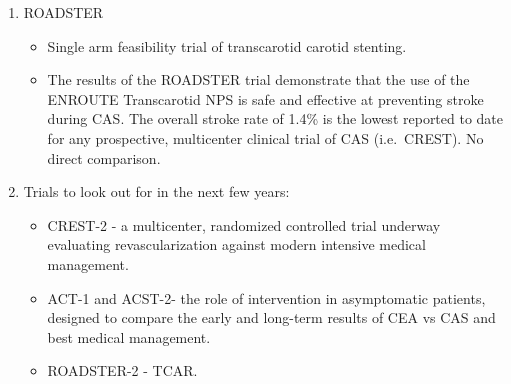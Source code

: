 \documentclass[
]{book}
\providecommand{\tightlist}{%
  \setlength{\itemsep}{0pt}\setlength{\parskip}{0pt}}
\begin{document}
\begin{enumerate}
  \begin{itemize}
  \item
    Compared CEA vs.~CAS in both symptomatic and asymptomatic
    patients.
  \item
    Composite endpoint of 30-day stroke, MI, death equivalent
    between CEA and CAS.
  \item
    CAS had a significantly higher incidence of stroke and death
    than CEA and CEA higher incidence of MI.

    \begin{itemize}
    \tightlist
    \item
      Follow up at 10 years demonstrated no difference in
      composite stroke/MI/death but increased rate of stroke/death
      in stented patients likely attributable to increased
      periprocedural stroke. \citep{brottLongTermResultsStenting2016b}
    \item
      CAS patients with stroke had a higher impact on QOL than CEA
      patients with MI.\citep{brott2010, redfern2011, mantese2010}
    \end{itemize}
  \item
    Subanalyses identified that older patients (\textgreater70y) had better
    outcomes after CEA than CAS, the QOL impact of stroke was more
    significant than that of MI, and anatomic characteristics of
    carotid lesions (longer, sequential, remote) were predictive of
    increased stroke and death after CAS.
  \item
    Unfortunately, this study provides a benchmark to strive for,
    but no other large trials have achieved these results.
  \end{itemize}
\item
  ROADSTER\citep{kwolek2015}

  \begin{itemize}
  \item
    Single arm feasibility trial of transcarotid carotid stenting.
  \item
    The results of the ROADSTER trial demonstrate that the use of
    the ENROUTE Transcarotid NPS is safe and effective at preventing
    stroke during CAS. The overall stroke rate of 1.4\% is the lowest
    reported to date for any prospective, multicenter clinical trial
    of CAS (i.e.~CREST). No direct comparison.
  \end{itemize}
\item
  Trials to look out for in the next few years:

  \begin{itemize}
  \item
    CREST-2 - a multicenter, randomized controlled trial underway
    evaluating revascularization against modern intensive medical
    management.
  \item
    ACT-1 and ACST-2- the role of intervention in asymptomatic
    patients, designed to compare the early and long-term results of
    CEA vs CAS and best medical management.
  \item
    ROADSTER-2 - TCAR.
  \end{itemize}
\end{enumerate}
\end{document}
